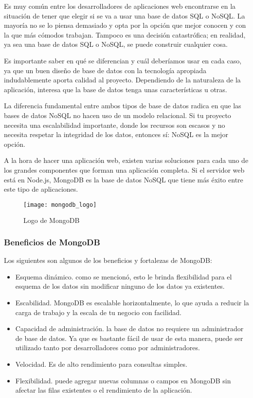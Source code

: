 Es muy común entre los desarrolladores de aplicaciones web encontrarse en la situación de tener que elegir si se va a usar una base de datos SQL o NoSQL. La mayoría no se lo piensa demasiado y opta por la opción que mejor conocen y con la que más cómodos trabajan. Tampoco es una decisión catastrófica; en realidad, ya sea una base de datos SQL o NoSQL, se puede construir cualquier cosa.

Es importante saber en qué se diferencian y cuál deberíamos usar en cada caso, ya que un buen diseño de base de datos con la tecnología apropiada indudablemente aporta calidad al proyecto. Dependiendo de la naturaleza de la aplicación, interesa que la base de datos tenga unas características u otras.

La diferencia fundamental entre ambos tipos de base de datos radica en que las bases de datos NoSQL no hacen uso de un modelo relacional. Si tu proyecto necesita una escalabilidad importante, donde los recursos son escasos y no necesita respetar la integridad de los datos, entonces sí: NoSQL es la mejor opción.

A la hora de hacer una aplicación web, existen varias soluciones para cada uno de los grandes componentes que forman una aplicación completa. Si el servidor web está en Node.js, MongoDB es la base de datos NoSQL que tiene más éxito entre este tipo de aplicaciones.

\begin{figure}[htp!]
  \centering
  \texttt{[image: mongodb\_logo]}
  \caption{Logo de MongoDB}
  \label{fig:mongodb_logo}
\end{figure}

\subsubsection{Beneficios de MongoDB}

Los siguientes son algunos de los beneficios y fortalezas de MongoDB:

\begin{itemize}
  \item Esquema dinámico. como se mencionó, esto le brinda flexibilidad para el esquema de los datos sin modificar ninguno de los datos ya existentes.
  \item Escabilidad. MongoDB es escalable horizontalmente, lo que ayuda a reducir la carga de trabajo y la escala de tu negocio con facilidad.
  \item Capacidad de administración. la base de datos no requiere un administrador de base de datos. Ya que es bastante fácil de usar de esta manera, puede ser utilizado tanto por desarrolladores como por administradores.
  \item Velocidad. Es de alto rendimiento para consultas simples.
  \item Flexibilidad. puede agregar nuevas columnas o campos en MongoDB sin afectar las filas existentes o el rendimiento de la aplicación.
\end{itemize}

